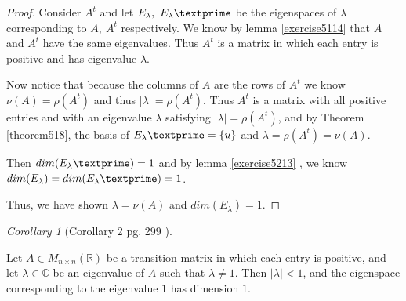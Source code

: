 \documentclass{amsart}
\theoremstyle{definition}
\theoremstyle{remark}
\newtheorem{corollary}{Corollary}[theorem]
\numberwithin{equation}{section}
\begin{document}
\begin{proof}

    Consider $A^t$ and let $E_{\lambda},\ E_{\lambda}\textprime$ be the eigenspaces of $\lambda$ corresponding to $A,\ A^t$ respectively.
    We know by lemma \ref{exercise5114} that $A$ and $A^t$ have the same eigenvalues.
    Thus $A^t$ is a matrix in which each entry is positive and has eigenvalue $\lambda$.

    Now notice that because the columns of $A$ are the rows of $A^t$ we know $\nu(A) = \rho(A^t)$ and thus $|\lambda| = \rho(A^t)$.
    Thus $A^t$ is a matrix with all positive entries and with an eigenvalue $\lambda$ satisfying $|\lambda| = \rho(A^t)$, and by Theorem \ref{theorem518},
    the basis of $E_{\lambda}\textprime = \{ u \}$ and $\lambda = \rho(A^t) = \nu(A)$.

    Then $dim(E_{\lambda}\textprime) = 1$ and by lemma \ref{exercise5213} , we know $dim(E_{\lambda}) = dim(E_{\lambda}\textprime) = 1$.

    Thus, we have shown $\lambda = \nu(A)$ and $dim(E_{\lambda}) = 1$.

\end{proof}



\begin{corollary}[Corollary 2 pg. 299 \cite{friedberg2003linear}]\label{cor5182}

    Let $A \in M_{n \times n}(\mathbb{R})$ be a transition matrix in which each entry is positive, and let $\lambda \in \mathbb{C}$
    be an eigenvalue of $A$ such that $\lambda \neq 1$.
    Then  $|\lambda| < 1$, and the eigenspace corresponding to the eigenvalue $1$ has dimension $1$.

\end{corollary}
\end{document}
